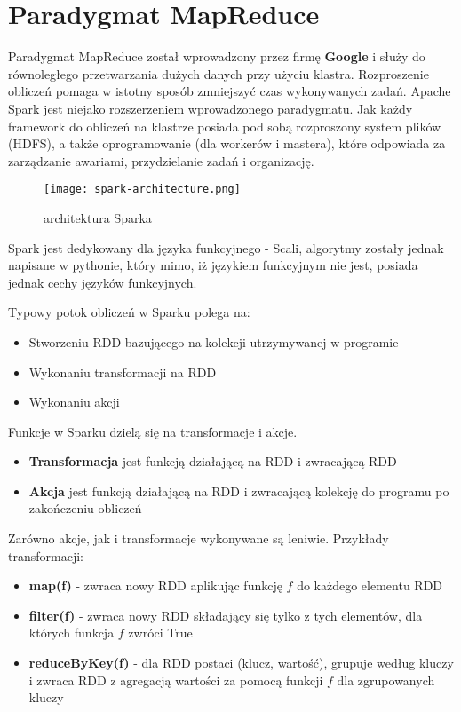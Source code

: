 \documentclass[magisterska]{pracamgr}
\theoremstyle{plain}
\theoremstyle{definition}
\theoremstyle{remark}
\begin{document}
\section{Paradygmat MapReduce}

Paradygmat MapReduce został wprowadzony przez firmę \textbf{Google} i służy do równoległego przetwarzania
dużych danych przy użyciu klastra.
Rozproszenie obliczeń pomaga w istotny sposób zmniejszyć czas wykonywanych zadań.
Apache Spark jest niejako rozszerzeniem wprowadzonego paradygmatu. 
Jak każdy framework do obliczeń na klastrze posiada pod sobą rozproszony system plików (HDFS), 
a także oprogramowanie (dla workerów i mastera), które odpowiada za zarządzanie awariami, przydzielanie 
zadań i organizację. 
\newpage

\begin{figure}
 \caption{architektura Sparka}
 \texttt{[image: spark-architecture.png]}
\end{figure}

Spark jest dedykowany dla języka funkcyjnego - Scali, algorytmy zostały jednak napisane w pythonie, który 
mimo, iż językiem funkcyjnym nie jest, posiada jednak cechy języków funkcyjnych. 

Typowy potok obliczeń w Sparku polega na:
\begin{itemize}
 \item Stworzeniu RDD bazującego na kolekcji utrzymywanej w programie
 \item Wykonaniu transformacji na RDD
 \item Wykonaniu akcji
\end{itemize}

Funkcje w Sparku dzielą się na transformacje i akcje. 
\begin{itemize}
 \item \textbf{Transformacja} jest funkcją działającą na RDD i zwracającą RDD
 \item \textbf{Akcja} jest funkcją działającą na RDD i zwracającą kolekcję do programu po zakończeniu obliczeń
\end{itemize}
Zarówno akcje, jak i transformacje wykonywane są leniwie. Przykłady transformacji:
\begin{itemize}
 \item \textbf{map(f)} - zwraca nowy RDD aplikując funkcję $f$ do każdego elementu RDD
 \item \textbf{filter(f)} - zwraca nowy RDD składający się tylko z tych elementów, dla których funkcja $f$ zwróci True
 \item \textbf{reduceByKey(f)} - dla RDD postaci (klucz, wartość), grupuje według kluczy i zwraca RDD z agregacją wartości 
 za pomocą funkcji $f$ dla zgrupowanych kluczy
\end{itemize}
\end{document}
